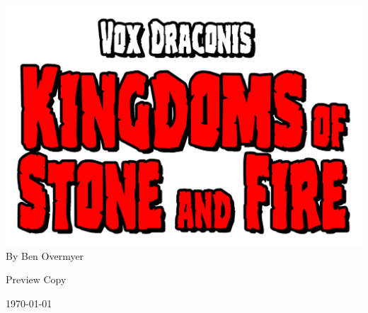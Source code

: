 \documentclass[letterpaper,table]{voxdraconis}
\begin{document}
\frontmatter
\thispagestyle{empty}

\begin{center}
\includegraphics[center]{vox-draconis-ksf-logo}
By Ben Overmyer

Preview Copy

\today
\end{center}

\setcounter{tocdepth}{2}
\tableofcontents
\newpage

\mainmatter












\printindex
\end{document}
